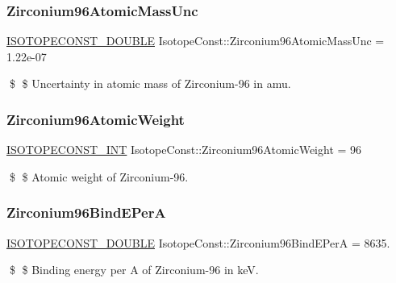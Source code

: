 \subsubsection{\texorpdfstring{Zirconium96\+Atomic\+Mass\+Unc}{Zirconium96AtomicMassUnc}}
{\footnotesize\ttfamily \mbox{\hyperlink{group___isotope_const-_macros_ga8f45a7272ce02c0b4c65c44636ed719a}{I\+S\+O\+T\+O\+P\+E\+C\+O\+N\+S\+T\+\_\+\+D\+O\+U\+B\+LE}} Isotope\+Const\+::\+Zirconium96\+Atomic\+Mass\+Unc = 1.\+22e-\/07}

\$ \$ Uncertainty in atomic mass of Zirconium-\/96 in amu. \mbox{\label{group___isotope_const-_zirconium-_zr96_ga41b183efcd1bb1484a9178d448530306}} 
\subsubsection{\texorpdfstring{Zirconium96\+Atomic\+Weight}{Zirconium96AtomicWeight}}
{\footnotesize\ttfamily \mbox{\hyperlink{group___isotope_const-_macros_ga5f18360b3e99483a35c32d789e62621c}{I\+S\+O\+T\+O\+P\+E\+C\+O\+N\+S\+T\+\_\+\+I\+NT}} Isotope\+Const\+::\+Zirconium96\+Atomic\+Weight = 96}

\$ \$ Atomic weight of Zirconium-\/96. \mbox{\label{group___isotope_const-_zirconium-_zr96_gabdc2ea4d7e15fb37cf409a8acad08e60}} 
\subsubsection{\texorpdfstring{Zirconium96\+Bind\+E\+PerA}{Zirconium96BindEPerA}}
{\footnotesize\ttfamily \mbox{\hyperlink{group___isotope_const-_macros_ga8f45a7272ce02c0b4c65c44636ed719a}{I\+S\+O\+T\+O\+P\+E\+C\+O\+N\+S\+T\+\_\+\+D\+O\+U\+B\+LE}} Isotope\+Const\+::\+Zirconium96\+Bind\+E\+PerA = 8635.}

\$ \$ Binding energy per A of Zirconium-\/96 in keV. \mbox{\label{group___isotope_const-_zirconium-_zr96_gab5f8b8350128365eea14696ddc675cca}} 
